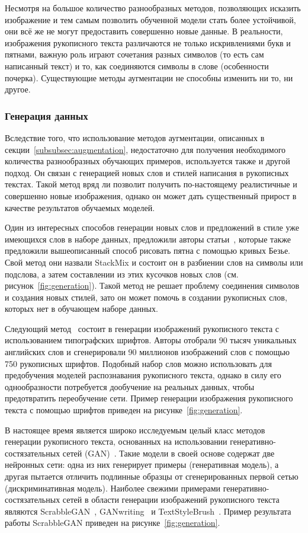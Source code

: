 Несмотря на большое количество разнообразных методов, позволяющих исказить изображение и тем самым позволить обученной
модели стать более устойчивой, они всё же не могут предоставить совершенно новые данные.
В реальности, изображения рукописного текста различаются не только искривлениями букв и пятнами, важную роль играют
сочетания разных символов (то есть сам написанный текст) и то, как соединяются символы в слове (особенности почерка).
Существующие методы аугментации не способны изменить ни то, ни другое.

\subsubsection{Генерация данных}
\label{subsubsec:generation}

Вследствие того, что использование методов аугментации, описанных в секции~\ref{subsubsec:augmentation}, недостаточно для
получения необходимого количества разнообразных обучающих примеров, используется также и другой подход.
Он связан с генерацией новых слов и стилей написания в рукописных текстах.
Такой метод вряд ли позволит получить по-настоящему реалистичные и совершенно новые изображения, однако он может дать
существенный прирост в качестве результатов обучаемых моделей.

Один из интересных способов генерации новых слов и предложений в стиле уже имеющихся слов в наборе данных,
предложили авторы статьи~\cite{shonenkov2021stackmix}, которые также предложили вышеописанный способ рисовать пятна с помощью кривых Безье.
Свой метод они назвали StackMix и состоит он в разбиении слов на символы или подслова, а затем составлении из этих кусочков новых слов (см. рисунок~\ref{fig:generation}).
Такой метод не решает проблему соединения символов и создания новых стилей, зато он может помочь в создании рукописных слов,
которых нет в обучающем наборе данных.

Следующий метод~\cite{krishnan2016generating} состоит в генерации изображений рукописного текста с использованием типографских шрифтов.
Авторы отобрали 90 тысяч уникальных английских слов и сгенерировали 90 миллионов изображений слов с помощью 750 рукописных шрифтов.
Подобный набор слов можно использовать для предобучения моделей распознавания рукописного текста,
однако в силу его однообразности потребуется дообучение на реальных данных, чтобы предотвратить переобучение сети.
Пример генерации изображения рукописного текста с помощью шрифтов приведен на рисунке~\ref{fig:generation}.

В настоящее время является широко исследуемым целый класс методов генерации рукописного текста,
основанных на использовании генеративно-состязательных сетей (GAN)~\cite{goodfellow2020generative}.
Такие модели в своей основе содержат две нейронных сети: одна из них генерирует примеры (генеративная модель),
а другая пытается отличить подлинные образцы от сгенерированных первой сетью (дискриминативная модель).
Наиболее свежими примерами генеративно-состязательных сетей в области генерации изображений рукописного текста являются
ScrabbleGAN~\cite{fogel2020scrabblegan}, GANwriting~\cite{kang2020ganwriting} и TextStyleBrush~\cite{krishnan2023textstylebrush}.
Пример результата работы ScrabbleGAN приведен на рисунке~\ref{fig:generation}.

